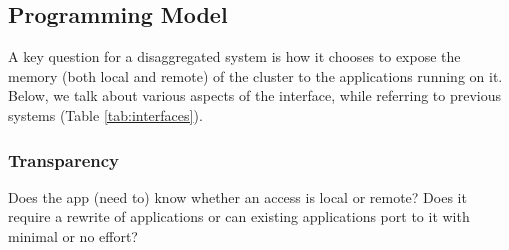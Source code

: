 
\subsection{Programming Model}
A key question for a disaggregated system is how it 
chooses to expose the memory (both local and remote) of the 
cluster to the applications running on it. Below, we talk about 
various aspects of the interface, while referring to 
previous systems (Table \ref{tab:interfaces}).

\subsubsection{Transparency}
Does the app (need to) know whether an access is local or 
remote? Does it require a rewrite of applications or can 
existing applications port to it with minimal or no effort?

